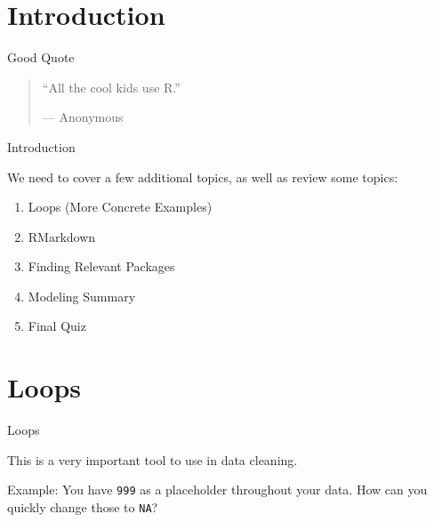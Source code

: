 \section{Introduction}\label{introduction}

\begin{frame}{Good Quote}

\begin{quote}
``All the cool kids use R.''

--- Anonymous
\end{quote}

\end{frame}

\begin{frame}{Introduction}

We need to cover a few additional topics, as well as review some topics:

\begin{enumerate}
\def\labelenumi{\arabic{enumi}.}
\tightlist
\item
  Loops (More Concrete Examples)
\item
  RMarkdown
\item
  Finding Relevant Packages
\item
  Modeling Summary
\item
  Final Quiz
\end{enumerate}

\end{frame}

\section{Loops}\label{loops}

\begin{frame}[fragile]{Loops}

This is a very important tool to use in data cleaning.

\vspace{25pt}

\begin{block}{Example: You have \texttt{999} as a placeholder throughout
your data. How can you quickly change those to \texttt{NA}?}

\end{block}

\end{frame}

